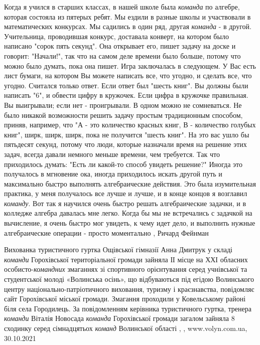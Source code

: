 Когда я учился в старших классах, в нашей школе была \emph{команда} по алгебре,
которая состояла из пятерых ребят. Мы ездили в разные школы и участвовали в
математических конкурсах. Мы садились в один ряд, другая \emph{команда} - в
другой.  Учительница, проводившая конкурс, доставала конверт, на котором было
написано "сорок пять секунд". Она открывает его, пишет задачу на доске и
говорит: "Начали!", так что на самом деле времени было больше, потому что можно
было думать, пока она пишет. Игра заключалась в следующем. У Вас есть лист
бумаги, на котором Вы можете написать все, что угодно, и сделать все, что
угодно.  Считался только ответ. Если ответ был "шесть книг". Вы должны были
написать "6", и обвести цифру в кружочек. Если цифра в кружочке правильная. Вы
выигрывали; если нет - проигрывали. В одном можно не сомневаться. Не было
никакой возможности решить задачу простым традиционным способом, приняв,
например, что "А - это количество красных книг, В - количество голубых книг",
ширк, ширк, ширк, пока не получится "шесть книг". На это вас ушло бы пятьдесят
секунд, потому что люди, которые назначали время на решение этих задач, всегда
давали немного меньше времени, чем требуется. Так что приходилось думать: "Есть
ли какой-то способ увидеть решение?" Иногда это получалось в мгновение ока,
иногда приходилось искать другой путь и максимально быстро выполнять
алгебраические действия. Это была изумительная практика, у меня получалось все
лучше и лучше, и в конце концов я возглавил \emph{команду}. Вот так я научился
очень быстро решать алгебраические задачки, и в колледже алгебра давалась мне
легко. Когда бы мы не встречались с задачкой на вычисление, я очень быстро мог
увидеть, к чему идет дело, и выполнить нужные алгебраические операции - просто
моментально
, Ричард Фейнман

Вихованка туристичного гуртка Ощівської гімназії Анна Дмитрук у складі
\emph{команди} Горохівської територіальної громади зайняла ІІ місце на ХХІ
обласних особисто-\emph{командних} змаганнях зі спортивного орієнтування серед
учнівської та студентської молоді «Волинська осінь», що відбуваються під егідою
Волинського центру національно-патріотичного виховання, туризму і краєзнавства,
повідомляє сайт Горохівської міської громади. Змагання проходили у Ковельському
районі біля села Городилець.  За повідомленням керівника туристичного гуртка,
тренера \emph{команди} Віталія Новосада \emph{команда} Горохівської громади загалом зайняла 8
сходинку серед сімнадцятьох \emph{команд} Волинської області
, 
, www.volyn.com.ua, 30.10.2021
